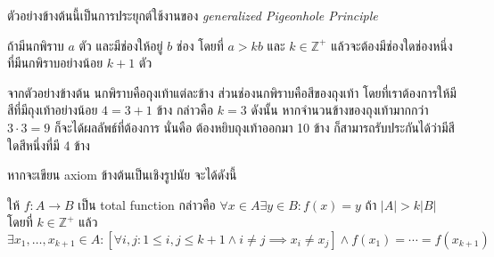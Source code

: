ตัวอย่างข้างต้นนี้เป็นการประยุกต์ใช้งานของ \emph{generalized Pigeonhole Principle}
\begin{axiom}
ถ้ามีนกพิราบ $a$ ตัว และมีช่องให้อยู่ $b$ ช่อง โดยที่ $a>kb$ และ $k\in\mathbb{Z}^+$ แล้วจะต้องมีช่องใดช่องหนึ่งที่มีนกพิราบอย่างน้อย $k+1$ ตัว
\end{axiom}

จากตัวอย่างข้างต้น นกพิราบคือถุงเท้าแต่ละข้าง ส่วนช่องนกพิราบคือสีของถุงเท้า โดยที่เราต้องการให้มีสีที่มีถุงเท้าอย่างน้อย $4=3+1$ ข้าง กล่าวคือ $k=3$ \enskip ดังนั้น หากจำนวนข้างของถุงเท้ามากกว่า $3\cdot 3=9$ ก็จะได้ผลลัพธ์ที่ต้องการ นั่นคือ ต้องหยิบถุงเท้าออกมา 10 ข้าง ก็สามารถรับประกันได้ว่ามีสีใดสีหนึ่งที่มี 4 ข้าง

หากจะเขียน axiom ข้างต้นเป็นเชิงรูปนัย จะได้ดังนี้
\begin{axiom}
ให้ $f:A\to B$ เป็น total function กล่าวคือ $\forall x\in A\exists y\in B: f(x)=y$ \enskip ถ้า $|A|>k|B|$ โดยที่ $k\in\mathbb{Z}^+$ แล้ว
\[\exists x_1,\ldots,x_{k+1}\in A: \left[\forall i,j: 1\leq i,j\leq k+1\wedge i\neq j\implies x_i\neq x_j\right] \wedge f(x_1)=\cdots=f(x_{k+1})\]
\end{axiom}
